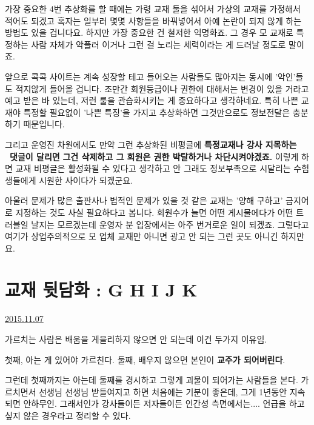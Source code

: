 가장 중요한 4번 추상화를 할 때에는 가령 교재 둘을 섞어서 가상의 교재를 가정해서 적어도 되겠고
혹자는 일부러 몇몇 사항들을 바꿔넣어서 아예 논란이 되지 않게 하는 방법도 있을 겁니다요.
하지만 가장 중요한 건 철저한 익명화죠. 그 경우 모 교재로 특정하는 사람 자체가 악플러 이거나 그런 걸 노리는 세력이라는 게 드러날 정도로 말이죠.
\vspace{5mm}

앞으로 콕콕 사이트는 계속 성장할 테고 들어오는 사람들도 많아지는 동시에 '악인'들도 적지않게 들어올 겁니다.
조만간 회원등급이나 권한에 대해서는 변경이 있을 거라고 예고 받은 바 있는데, 저런 룰을 관습화시키는 게 중요하다고 생각하네요.
특히 나쁜 교재야 특정할 필요없이 '나쁜 특징'을 가지고 추상화하면 그것만으로도 정보전달은 충분하기 때문입니다.
\vspace{5mm}

그리고 운영진 차원에서도 만약 그런 추상화된 비평글에 \textbf{특정교재나 강사 지목하는  댓글이 달리면}
\textbf{그건 삭제하고 그 회원은 권한 박탈하거나 차단시켜야겠죠.}
이렇게 하면 교재 비평글은 활성화될 수 있다고 생각하고
안 그래도 정보부족으로 시달리는 수험생들에게 시원한 사이다가 되겠군요.
\vspace{5mm}

아울러 문제가 많은 출판사나 법적인 문제가 있을 것 같은 교재는 '양해 구하고' 금지어로 지정하는 것도 사실 필요하다고 봅니다.
회원수가 늘면 어떤 게시물에다가 어떤 트러블일 날지는 모르겠는데 운영자 분 입장에서는 아주 번거로운 일이 되겠죠.
그렇다고 여기가 상업주의적으로 모 업체 교재만 아니면 광고 안 되는 그런 곳도 아니긴 하지만요.
\vspace{5mm}






\section{교재 뒷담화 : G H I J K}
\href{https://www.kockoc.com/Apoc/468220}{2015.11.07}

\vspace{5mm}

가르치는 사람은 배움을 게을리하지 않으면 안 되는데
이건 두가지 이유임.
\vspace{5mm}

첫째, 아는 게 있어야 가르친다.
둘째, 배우지 않으면 본인이 \textbf{교주가 되어버린다}.
\vspace{5mm}

그런데 첫째까지는 아는데 둘째를 경시하고 그렇게 괴물이 되어가는 사람들을 본다.
가르치면서 선생님 선생님 받들여지고 하면 처음에는 기분이 좋은데, 그게 1년동안 지속되면 안하무인.
그래서인가 강사들이든 저자들이든 인간성 측면에서는.... 언급을 하고싶지 않은 경우라고 정리할 수 있다.
\vspace{5mm}

